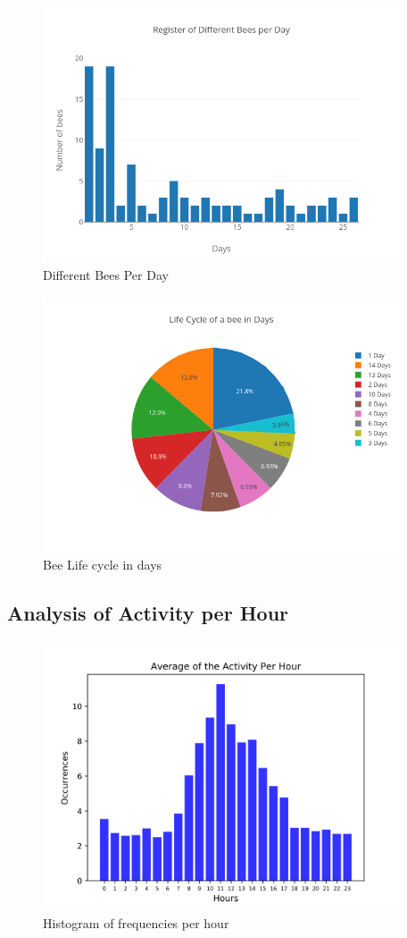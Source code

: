 \documentclass[11pt,fleqn]{book} %
\begin{document}
\begin{figure}[h!]%
\centering%
\includegraphics[width=400px]{Pictures/Morelia Hive 2differentBeesPerdayClean.png}%
\caption{Different Bees Per Day}%
\end{figure}

%


\begin{figure}[h!]%
\centering%
\includegraphics[width=400px]{Pictures/Morelia Hive 2pieBeeLifeCycleClean.png}%
\caption{Bee Life cycle in days}%
\end{figure}

%
\subsection{Analysis of Activity per Hour}%
\label{subsec:Analysis of Activity per Hour}%


\begin{figure}[h!]%
\centering%
\includegraphics[width=400px]{Pictures/Morelia Hive 2histogramClean.png}%
\caption{Histogram of frequencies per hour}%
\end{figure}
\end{document}
